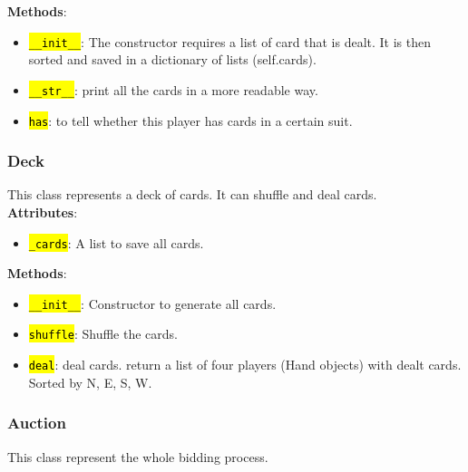 \documentclass[12pt]{article}
\newcommand{\code}[1]{\texttt{\hl{#1}}}
\begin{document}
\textbf{Methods}:\\
\begin{itemize}
\item \code{\_\_init\_\_}: The constructor requires a list of card
that is dealt. It is then sorted and saved in a dictionary of lists (self.cards).
\item \code{\_\_str\_\_}: print all the cards in a more readable way.
\item \code{has}: to tell whether this player has cards in a certain suit.
\end{itemize}

\subsubsection{Deck}%
\label{ssub:deck}
This class represents a deck of cards. It can shuffle and deal cards.\\

\textbf{Attributes}:\\
\begin{itemize}
\item \code{\_cards}: A list to save all cards.
\end{itemize}

\textbf{Methods}:\\
\begin{itemize}
\item \code{\_\_init\_\_}: Constructor to generate all cards.
\item \code{shuffle}: Shuffle the cards.
\item \code{deal}: deal cards. return a list of four players (Hand objects)
	with dealt cards. Sorted by N, E, S, W.
\end{itemize}

\subsubsection{Auction}%
\label{ssub:auction}
This class represent the whole bidding process.\\
\end{document}
